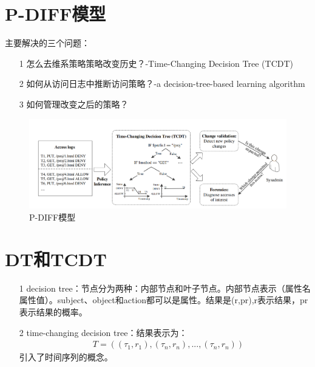 \documentclass[UTF8]{ctexart}
\begin{document}
	\section{P-DIFF模型}\label{sec:disanjie}
	主要解决的三个问题：
	\begin{itemize}
	\item[1] 怎么去维系策略策略改变历史？-Time-Changing Decision Tree (TCDT)
	\item[2] 如何从访问日志中推断访问策略？-a decision-tree-based learning algorithm
	\item[3] 如何管理改变之后的策略？
	\end{itemize}
	\begin{figure}[ht]
        \centering
        \includegraphics[scale=0.5]{picture/002.png}
        \caption{P-DIFF模型}
        \label{fig:001}
    \end{figure}
	\clearpage
	\section{DT和TCDT}\label{sec:disijie}
	\begin{itemize}
	\item[1] decision tree：节点分为两种：内部节点和叶子节点。内部节点表示（属性名 属性值）。subject、object和action都可以是属性。结果是(r,pr),r表示结果，pr表示结果的概率。
	\item[2] time-changing decision tree：结果表示为： 
	\begin{equation}\label{eq:mi}
    \begin{aligned}
    &T=((\tau_1,r_1),(\tau_n,r_n),...,(\tau_n,r_n))
    \end{aligned}
    \end{equation}
	引入了时间序列的概念。
	\end{itemize}
	\clearpage
\end{document}
